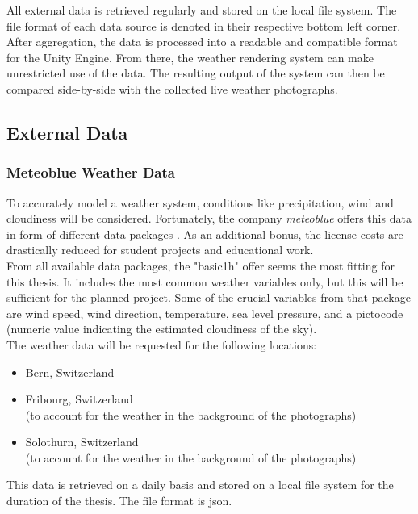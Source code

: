\noindent
All external data is retrieved regularly and stored on the local file system. The file format of each data source is denoted in their respective bottom left corner.
After aggregation, the data is processed into a readable and compatible format for the Unity Engine. From there, the weather rendering system can make unrestricted use of the data.
The resulting output of the system can then be compared side-by-side with the collected live weather photographs.

\clearpage

\subsection{External Data}
\label{section:externaldata}

\subsubsection{Meteoblue Weather Data}
To accurately model a weather system, conditions like precipitation, wind and cloudiness will be considered.
Fortunately, the company \emph{meteoblue} offers this data in form of different data packages \cite{meteoblue}.
As an additional bonus, the license costs are drastically reduced for student projects and educational work.
\\
From all available data packages, the "basic\textunderscore1h" \cite{meteoblue:basic1h} offer seems the most fitting for this thesis.
It includes the most common weather variables only, but this will be sufficient for the planned project.
Some of the crucial variables from that package are wind speed, wind direction, temperature, sea level pressure, and a pictocode (numeric value indicating the estimated cloudiness of the sky).
\\
The weather data will be requested for the following locations:
\begin{itemize}
    \item Bern, Switzerland
    \item Fribourg, Switzerland \\(to account for the weather in the background of the photographs)
    \item Solothurn, Switzerland \\(to account for the weather in the background of the photographs)
\end{itemize}

\noindent
This data is retrieved on a daily basis and stored on a local file system for the duration of the thesis. The file format is \gls{json}.

